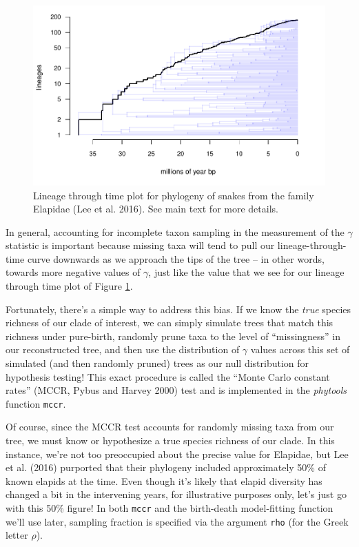 \documentclass[fleqn,10pt,lineno]{wlpeerj} %
\begin{document}
\begin{figure}
\includegraphics[width=1\linewidth]{Revell.phytools-v2_peerj_files/figure-latex/fig16-elap-ltt-1} \caption{Lineage through time plot for phylogeny of snakes from the family Elapidae (Lee et al. 2016). See main text for more details.}\label{fig:fig16-elap-ltt}
\end{figure}

In general, accounting for incomplete taxon sampling in the measurement of the \(\gamma\) statistic is important because missing taxa will tend to pull our lineage-through-time curve downwards as we approach the tips of the tree -- in other words, towards more negative values of \(\gamma\), just like the value that we see for our lineage through time plot of Figure \ref{fig:fig16-elap-ltt}.

Fortunately, there's a simple way to address this bias. If we know the \emph{true} species richness of our clade of interest, we can simply simulate trees that match this richness under pure-birth, randomly prune taxa to the level of ``missingness'' in our reconstructed tree, and then use the distribution of \(\gamma\) values across this set of simulated (and then randomly pruned) trees as our null distribution for hypothesis testing! This exact procedure is called the ``Monte Carlo constant rates'' (MCCR, Pybus and Harvey 2000) test and is implemented in the \emph{phytools} function \texttt{mccr}.

Of course, since the MCCR test accounts for randomly missing taxa from our tree, we must know or hypothesize a true species richness of our clade. In this instance, we're not too preoccupied about the precise value for Elapidae, but Lee et al. (2016) purported that their phylogeny included approximately 50\% of known elapids at the time. Even though it's likely that elapid diversity has changed a bit in the intervening years, for illustrative purposes only, let's just go with this 50\% figure! In both \texttt{mccr} and the birth-death model-fitting function we'll use later, sampling fraction is specified via the argument \texttt{rho} (for the Greek letter \(\rho\)).
\end{document}
